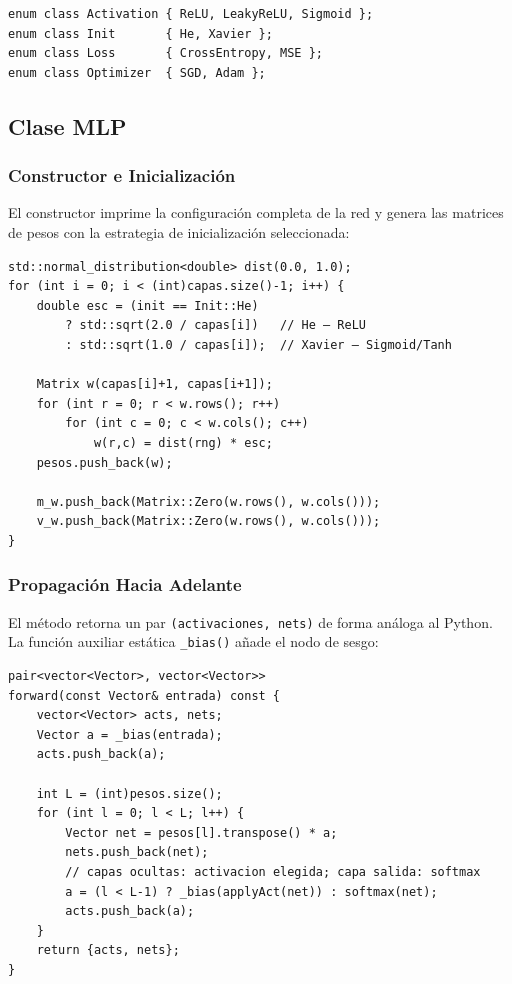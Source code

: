 \begin{lstlisting}[style=cpp, caption={Enumerados de configuración}]
enum class Activation { ReLU, LeakyReLU, Sigmoid };
enum class Init       { He, Xavier };
enum class Loss       { CrossEntropy, MSE };
enum class Optimizer  { SGD, Adam };
\end{lstlisting}

\subsection{Clase MLP}

\subsubsection{Constructor e Inicialización}

El constructor imprime la configuración completa de la red y genera las matrices de pesos
con la estrategia de inicialización seleccionada:

\begin{lstlisting}[style=cpp, caption={Inicialización de pesos en C++}]
std::normal_distribution<double> dist(0.0, 1.0);
for (int i = 0; i < (int)capas.size()-1; i++) {
    double esc = (init == Init::He)
        ? std::sqrt(2.0 / capas[i])   // He — ReLU
        : std::sqrt(1.0 / capas[i]);  // Xavier — Sigmoid/Tanh

    Matrix w(capas[i]+1, capas[i+1]);
    for (int r = 0; r < w.rows(); r++)
        for (int c = 0; c < w.cols(); c++)
            w(r,c) = dist(rng) * esc;
    pesos.push_back(w);

    m_w.push_back(Matrix::Zero(w.rows(), w.cols()));
    v_w.push_back(Matrix::Zero(w.rows(), w.cols()));
}
\end{lstlisting}

\subsubsection{Propagación Hacia Adelante}

El método retorna un par \texttt{(activaciones, nets)} de forma análoga al Python. La
función auxiliar estática \texttt{\_bias()} añade el nodo de sesgo:

\begin{lstlisting}[style=cpp, caption={forward en C++}]
pair<vector<Vector>, vector<Vector>>
forward(const Vector& entrada) const {
    vector<Vector> acts, nets;
    Vector a = _bias(entrada);
    acts.push_back(a);

    int L = (int)pesos.size();
    for (int l = 0; l < L; l++) {
        Vector net = pesos[l].transpose() * a;
        nets.push_back(net);
        // capas ocultas: activacion elegida; capa salida: softmax
        a = (l < L-1) ? _bias(applyAct(net)) : softmax(net);
        acts.push_back(a);
    }
    return {acts, nets};
}
\end{lstlisting}

